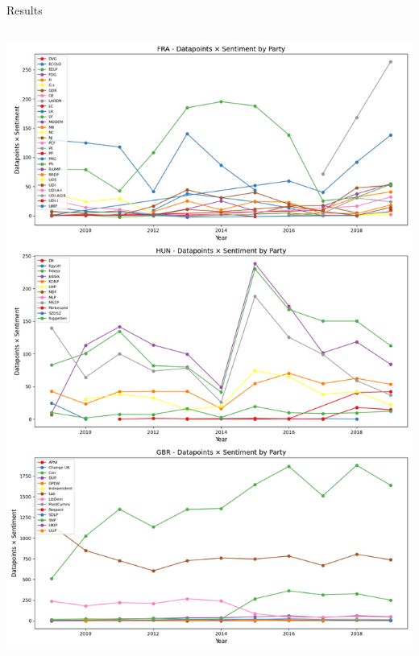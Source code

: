 \documentclass[8pt]{beamer}
\begin{document}
\begin{frame}{Results}
\begin{columns}[T]
\begin{column}{0.5\textwidth}
        \includegraphics[width=\textwidth]{img/datapoints_times_sentiment_3_rows.png}
    \end{column}
\end{columns}
\end{frame}
\end{document}
